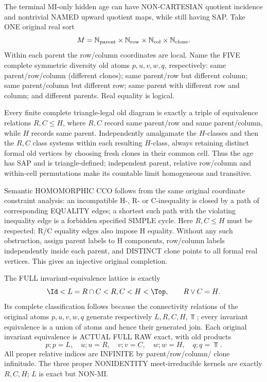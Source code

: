 \begin{example}
\label{ex:typed-hierarchical-three-mi}
The terminal MI-only hidden age can have
NON-CARTESIAN quotient incidence and
nontrivial NAMED upward quotient maps,
while still having SAP.
Take ONE original real sort
\[
 M=\mathbb N_{\rm parent}\times
   \mathbb N_{\rm row}\times
   \mathbb N_{\rm col}\times
   \mathbb N_{\rm clone}.
\]
Within each parent the row/column
coordinates are local. Name the
FIVE complete symmetric diversity
old atoms $p,u,v,w,q$,
respectively: same parent/row/column
(different clones); same parent/row
but different column; same
parent/column but different row;
same parent with different row and
column; and different parents.
Real equality is logical.

Every finite complete triangle-legal
old diagram is exactly a triple of
equivalence relations $R,C\le H$,
where $R,C$ record same parent/row
and same parent/column, while
$H$ records same parent.
Independently amalgamate the
$H$-classes and then the $R,C$
class systems within each resulting
$H$-class, always retaining distinct
formal old vertices by choosing
fresh clones in their common cell.
Thus the age has SAP and is
triangle-defined; independent
parent, relative row/column and
within-cell permutations make
its countable limit homogeneous
and transitive.

Semantic HOMOMORPHIC CCO follows
from the same original coordinate
constraint analysis: an incompatible
H-, R- or C-inequality is closed
by a path of corresponding
EQUALITY edges; a shortest such
path with the violating inequality
edge is a forbidden specified
SIMPLE cycle. Here $R,C\le H$
must be respected: R/C equality
edges also impose H equality.
Without any such obstruction,
assign parent labels to H
components, row/column labels
independently inside each parent,
and DISTINCT clone points to all
formal real vertices. This gives
an injective original completion.

The FULL invariant-equivalence
lattice is exactly
\[
                 \Id<L=R\cap C<R,C<H<\Top,
                 \qquad R\vee C=H.
\]
Its complete classification follows
because the connectivity relations
of the original atoms
$p,u,v,w,q$ generate respectively
$L,R,C,H,\Top$; every invariant
equivalence is a union of atoms
and hence their generated join.
Each original invariant
equivalence is ACTUAL FULL RAW
exact, with old products
\[
         p;p=L,\quad u;u=R,\quad
         v;v=C,\quad w;w=H,\quad
         q;q=\Top .
\]
All proper relative indices
are INFINITE by parent/row/column/
clone infinitude. The three
proper NONIDENTITY meet-irreducible
kernels are exactly $R,C,H$;
$L$ is exact but NON-MI.


\end{example}
